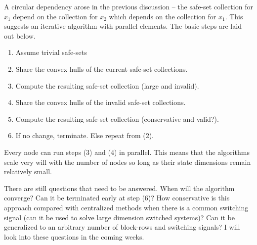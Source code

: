 \documentclass[10pt,a4paper]{article}
\begin{document}
A circular dependency arose in the previous discussion -- the safe-set collection for $x_1$ depend on the collection for $x_2$ which depends on the collection for $x_1$. This suggests an iterative algorithm with parallel elements. The basic steps are laid out below.
\begin{enumerate}
	\item Assume trivial safe-sets
	\item Share the convex hulls of the current safe-set collections.
	\item Compute the resulting safe-set collection (large and invalid).
	\item Share the convex hulls of the invalid safe-set collections.
	\item Compute the resulting safe-set collection (conservative and valid?).
	\item If no change, terminate. Else repeat from (2).
\end{enumerate} 
Every node can run steps (3) and (4) in parallel. This means that the algorithms scale very will with the number of nodes so long as their state dimensions remain relatively small.

There are still questions that need to be answered. When will the algorithm converge? Can it be terminated early at step (6)? How conservative is this approach compared with centralized methods when there is a common switching signal (can it be used to solve large dimension switched systems)? Can it be generalized to an arbitrary number of block-rows and switching signals? I will look into these questions in the coming weeks.

\printbibliography
\end{document}
